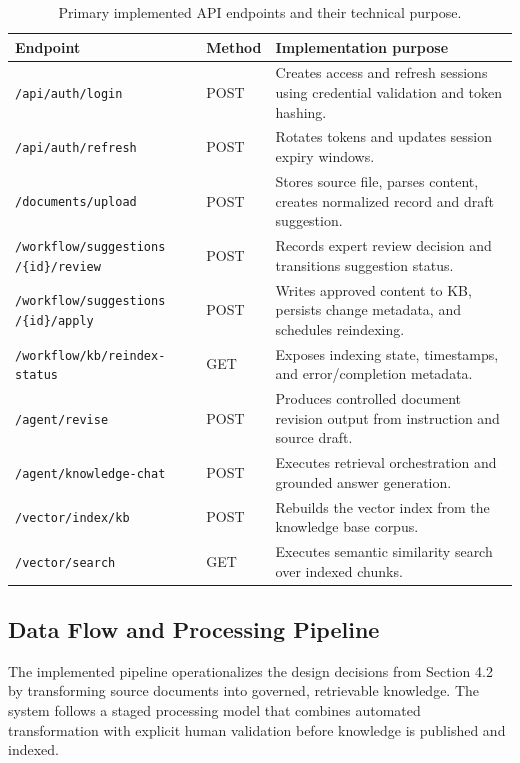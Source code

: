 \begin{table}[H]
\centering
\small
\begin{tabular}{p{5.0cm} p{1.5cm} p{9cm}}
\textbf{Endpoint} & \textbf{Method} & \textbf{Implementation purpose} \\
\hline
\texttt{/api/auth/login} & POST & Creates access and refresh sessions using credential validation and token hashing. \\
\hline
\texttt{/api/auth/refresh} & POST & Rotates tokens and updates session expiry windows. \\
\hline
\texttt{/documents/upload} & POST & Stores source file, parses content, creates normalized record and draft suggestion. \\
\hline
\texttt{/workflow/suggestions
/\{id\}/review} & POST & Records expert review decision and transitions suggestion status. \\
\hline
\texttt{/workflow/suggestions
/\{id\}/apply} & POST & Writes approved content to KB, persists change metadata, and schedules reindexing. \\
\hline
\texttt{/workflow/kb/reindex-status} & GET & Exposes indexing state, timestamps, and error/completion metadata. \\
\hline
\texttt{/agent/revise} & POST & Produces controlled document revision output from instruction and source draft. \\
\hline
\texttt{/agent/knowledge-chat} & POST & Executes retrieval orchestration and grounded answer generation. \\
\hline
\texttt{/vector/index/kb} & POST & Rebuilds the vector index from the knowledge base corpus. \\
\hline
\texttt{/vector/search} & GET & Executes semantic similarity search over indexed chunks. \\
\hline
\end{tabular}
\caption{Primary implemented API endpoints and their technical purpose.}
\label{tab:implemented_apis}
\end{table}


\subsection{Data Flow and Processing Pipeline}

The implemented pipeline operationalizes the design decisions from Section 4.2 by transforming source documents into governed, retrievable knowledge. The system follows a staged processing model that combines automated transformation with explicit human validation before knowledge is published and indexed.

